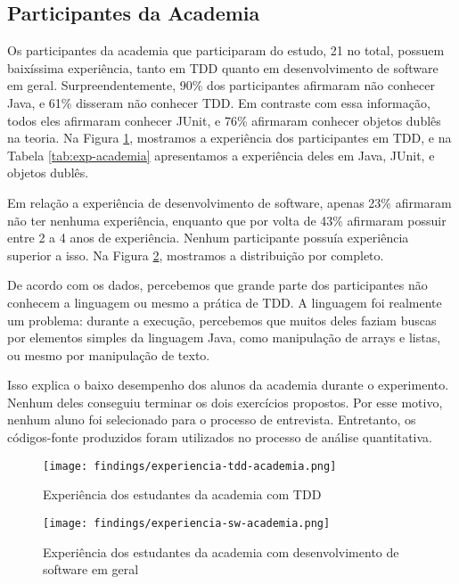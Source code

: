 \subsection{Participantes da Academia}
\label{findings-desc-academia}

Os participantes da academia que participaram do estudo, 21 no total, possuem baixíssima experiência,
tanto em TDD quanto em desenvolvimento de software em geral. Surpreendentemente, 90\%
dos participantes afirmaram não conhecer Java, e 61\% disseram não conhecer TDD.
Em contraste com essa informação, todos eles afirmaram conhecer JUnit, e 76\% afirmaram
conhecer objetos dublês na teoria. 
Na Figura \ref{fig:exp-tdd-academia}, mostramos a experiência dos participantes em TDD, e
na Tabela \ref{tab:exp-academia} apresentamos a experiência deles em Java, JUnit, e objetos
dublês.

Em relação a experiência de desenvolvimento de software, apenas 23\% afirmaram não
ter nenhuma experiência, enquanto que por volta de 43\% afirmaram possuir
entre 2 a 4 anos de experiência. Nenhum participante possuía experiência superior a isso.
Na Figura \ref{fig:exp-sw-academia}, mostramos a distribuição por completo.

De acordo com os dados, percebemos que grande parte dos participantes não conhecem a linguagem ou
mesmo a prática de TDD. A linguagem foi realmente um problema: durante a execução, percebemos
que muitos deles faziam buscas por elementos simples da linguagem Java, como manipulação de arrays
e listas, ou mesmo por manipulação de texto.

Isso explica o baixo desempenho dos alunos da academia durante
o experimento. Nenhum deles conseguiu terminar os dois exercícios propostos. Por esse
motivo, nenhum aluno foi selecionado para o processo de entrevista. Entretanto,
os códigos-fonte produzidos foram utilizados no processo de análise quantitativa.

\begin{figure}[h!]
  \centering
  \texttt{[image: findings/experiencia-tdd-academia.png]}
  \caption{Experiência dos estudantes da academia com TDD}
  \label{fig:exp-tdd-academia}
\end{figure}

\begin{figure}[h!]
  \centering
  \texttt{[image: findings/experiencia-sw-academia.png]}
  \caption{Experiência dos estudantes da academia com desenvolvimento de software em geral}
  \label{fig:exp-sw-academia}
\end{figure}


